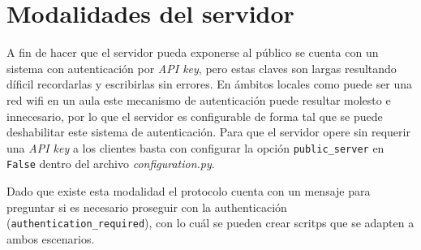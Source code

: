 \section{Modalidades del servidor}

A fin de hacer que el servidor pueda exponerse al público se cuenta con
un sistema con autenticación por \textit{API key}, pero estas claves
son largas resultando díficil recordarlas y escribirlas sin errores. En
ámbitos locales como puede ser una red wifi en un aula este mecanismo
de autenticación puede resultar molesto e innecesario, por lo que el
servidor es configurable de forma tal que se puede deshabilitar este
sistema de autenticación. Para que el servidor opere sin requerir
una \textit{API key} a los clientes basta con configurar la opción
\texttt{public\_server} en \texttt{False} dentro del archivo
\textit{configuration.py}.

Dado que existe esta modalidad el protocolo cuenta con un mensaje
para preguntar si es necesario proseguir con la authenticación
(\texttt{authentication\_required}), con lo cuál se pueden crear
scritps que se adapten a ambos escenarios.

